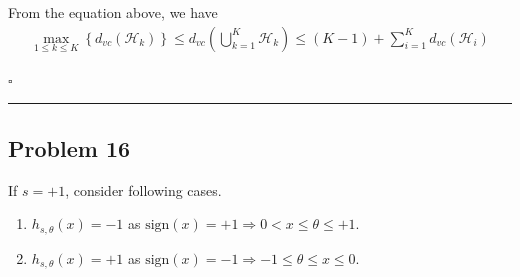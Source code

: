 \documentclass[12pt]{article}
\newcommand*{\QEDB}{\hfill\ensuremath{\square}}
\newcommand{\CBrackets}[1]{\left\{#1\right\}}
\newcommand{\SBrackets}[1]{\left[#1\right]}
\newcommand{\ParTh}[1]{\left(#1\right)}
\newcommand{\AbsVal}[1]{\left|#1\right|}
\newcommand{\Divide}[2]{\left.#1\middle/#2\right.}
\newcommand{\horrule}[1]{\rule{\linewidth}{#1}}
\begin{document}
From the equation above, we have
\begin{align}
\max_{1\leq k\leq K}\CBrackets{d_{vc}\ParTh{\mathcal{H}_k}}\leq d_{vc}\ParTh{\bigcup^K_{k=1}\mathcal{H}_k}\leq \ParTh{K-1}+\sum_{i=1}^{K}d_{vc}\ParTh{\mathcal{H}_i}
\end{align}

\QEDB

\horrule{0.5pt}

\subsection*{Problem 16}

If $s = +1$, consider following cases.
\begin{enumerate}
\item $h_{s,\theta}\ParTh{x}=-1$ as $\text{sign}\ParTh{x}=+1\Rightarrow 0<x\leq\theta\leq+1$.
\item $h_{s,\theta}\ParTh{x}=+1$ as $\text{sign}\ParTh{x}=-1\Rightarrow -1\leq\theta\leq x\leq0$.
\end{enumerate}

\end{document}
